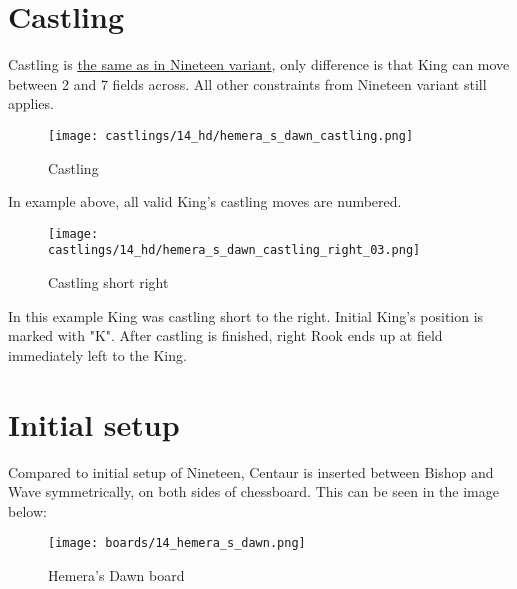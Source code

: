 \section*{Castling}
\label{sec:Hemera's Dawn/Castling}

Castling is
\hyperref[sec:Nineteen/Castling]{the same as in Nineteen variant},
only difference is that King can move
between 2 and 7 fields across. All other constraints from Nineteen variant still
applies.

\noindent
\begin{figure}[!h]
\texttt{[image: castlings/14\_hd/hemera\_s\_dawn\_castling.png]}
\caption{Castling}
\label{fig:hemera_s_dawn_castling}
\end{figure}

In example above, all valid King's castling moves are numbered.

\noindent
\begin{figure}[!h]
\texttt{[image: castlings/14\_hd/hemera\_s\_dawn\_castling\_right\_03.png]}
\caption{Castling short right}
\label{fig:hemera_s_dawn_castling_right_03}
\end{figure}

In this example King was castling short to the right. Initial King's position is
marked with "K". After castling is finished, right Rook ends up at field immediately
left to the King.

\clearpage %

\section*{Initial setup}
\label{sec:Hemera's Dawn/Initial setup}

Compared to initial setup of Nineteen, Centaur is inserted between Bishop and Wave
symmetrically, on both sides of chessboard. This can be seen in the image below:

\noindent
\begin{figure}[h]
\texttt{[image: boards/14\_hemera\_s\_dawn.png]}
\caption{Hemera's Dawn board}
\label{fig:14_hemera_s_dawn}
\end{figure}

\clearpage %
